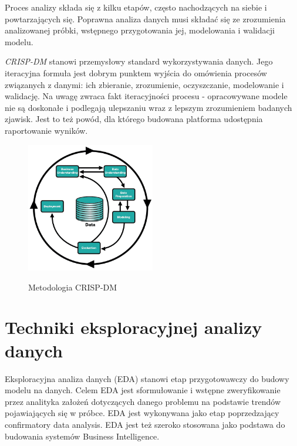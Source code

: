 \documentclass[12pt,a4paper,oneside]{report} %
\begin{document}
Proces analizy składa się z kilku etapów, często nachodzących na siebie i powtarzających się. Poprawna analiza danych musi składać się ze zrozumienia analizowanej próbki, wstępnego przygotowania jej, modelowania i walidacji modelu. \par

\emph{CRISP-DM} stanowi przemysłowy standard wykorzystywania danych. Jego iteracyjna formuła jest dobrym punktem wyjścia do omówienia procesów związanych z danymi: ich zbieranie, zrozumienie, oczyszczanie, modelowanie i walidację. Na uwagę zwraca fakt iteracyjności procesu - opracowywane modele nie są doskonałe i podlegają ulepszaniu wraz z lepszym zrozumieniem badanych zjawisk. Jest to też powód, dla którego budowana platforma udostępnia raportowanie wyników. \cite{crispdm} \par

\begin{figure}
\centering
\includegraphics[width=0.5\textwidth]{crisp-dm.png}
\label{crisp-dm}
\caption{Metodologia CRISP-DM}
\end{figure}





\section{Techniki eksploracyjnej analizy danych}

Eksploracyjna analiza danych (EDA) stanowi etap przygotowawczy do budowy modelu na danych. Celem EDA jest sformułowanie i wstępne zweryfikowanie przez analityka założeń dotyczących danego problemu na podstawie trendów pojawiających się w próbce. EDA jest wykonywana jako etap poprzedzający confirmatory data analysis. EDA jest też szeroko stosowana jako podstawa do budowania systemów Business Intelligence.\cite{hseltman} \par 
\end{document}
